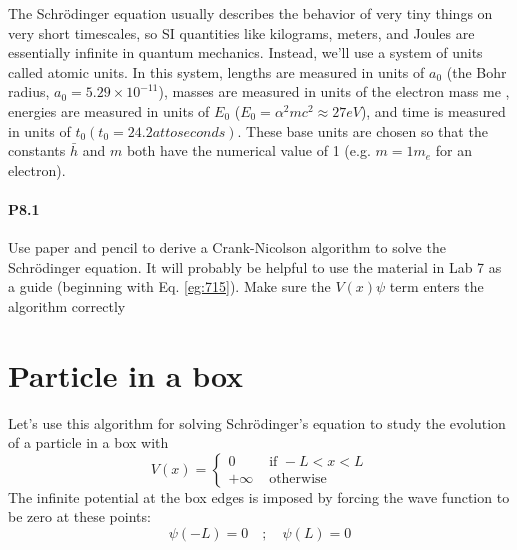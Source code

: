 \documentclass{book}
\theoremstyle{plain}
\theoremstyle{definition}
\numberwithin{exm}{chapter}
\theoremstyle{remark}
\theoremstyle{summary}
\theoremstyle{overview}
\begin{document}
The Schr{\"o}dinger equation usually describes the behavior of very tiny things
on very short timescales, so SI quantities like kilograms, meters, and Joules are
essentially infinite in quantum mechanics. Instead, we\rq ll use a system of units
called atomic units. In this system, lengths are measured in units of $a_0$ (the Bohr
radius, $a_0 = 5.29×10^{−11}$), masses are measured in units of the electron mass me ,
energies are measured in units of $E_0$ ($E_0 = \alpha^2mc^2 \approx 27 eV$), and time is measured
in units of $t_0 (t_0 = 24.2 attoseconds)$. These base units are chosen so that the
constants $\bar{h}$ and $m$ both have the numerical value of 1 (e.g. $m = 1m_e$ for an electron).
\paragraph*{P8.1}
Use paper and pencil to derive a Crank-Nicolson algorithm to solve the
Schr{\"o}dinger equation. It will probably be helpful to use the material in
Lab 7 as a guide (beginning with Eq. \eqref{eg:715}). Make sure the $V(x)\psi$ term
enters the algorithm correctly
\section*{Particle in a box}
Let\rq s use this algorithm for solving Schr{\"o}dinger\rq s equation to study the evolution
of a particle in a box with
\begin{equation}\label{eq:82}
V(x)= \begin{cases}0 & \text { if }-L<x<L \\ +\infty & \text { otherwise }\end{cases}
\end{equation}
The infinite potential at the box edges is imposed by forcing the wave function to
be zero at these points:
\begin{equation}\label{eq:83}
\psi(-L)=0 \quad ; \quad \psi(L)=0
\end{equation}
\end{document}

